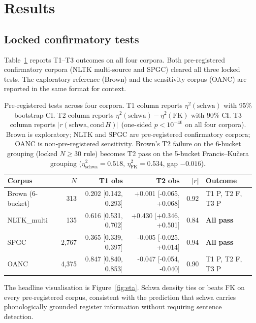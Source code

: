 \documentclass[11pt,a4paper]{article}
\begin{document}
\section{Results}

\subsection{Locked confirmatory tests}

Table~\ref{tab:tests} reports T1--T3 outcomes on all four corpora.
Both pre-registered confirmatory corpora (NLTK multi-source and SPGC)
cleared all three locked tests. The exploratory reference (Brown) and
the sensitivity corpus (OANC) are reported in the same format for
context.

\begin{table}[ht]
\centering
\small
\begin{tabular}{lrrrrl}
\toprule
Corpus & \(N\) & T1 obs & T2 obs & \(\lvert r \rvert\) & Outcome \\
\midrule
Brown (6-bucket) & 313 & 0.202 [0.142, 0.293] & {+}0.001 [{-}0.065, {+}0.068] & 0.92 & T1 P, T2 F, T3 P \\
NLTK\_multi      & 135 & 0.616 [0.531, 0.702] & {+}0.430 [{+}0.346, {+}0.501] & 0.84 & \textbf{All pass} \\
SPGC             & 2{,}767 & 0.365 [0.339, 0.397] & {-}0.005 [{-}0.025, {+}0.014] & 0.94 & \textbf{All pass} \\
OANC             & 4{,}375 & 0.847 [0.840, 0.853] & {-}0.047 [{-}0.054, {-}0.040] & 0.90 & T1 P, T2 F, T3 P \\
\bottomrule
\end{tabular}
\caption{Pre-registered tests across four corpora. T1 column reports
\(\eta^2(\text{schwa})\) with 95\% bootstrap CI. T2 column reports
\(\eta^2(\text{schwa}) - \eta^2(\text{FK})\) with 90\% CI. T3 column
reports \(\lvert r(\text{schwa}, \text{cond}\,H) \rvert\) (one-sided
\(p < 10^{-40}\) on all four corpora). Brown is exploratory; NLTK and
SPGC are pre-registered confirmatory corpora; OANC is non-pre-registered
sensitivity. Brown's T2 failure on the 6-bucket grouping (locked
\(N \ge 30\) rule) becomes T2 pass on the 5-bucket Francis--Ku\v{c}era
grouping (\(\eta^2_{\text{schwa}}=0.518\),
\(\eta^2_{\text{FK}}=0.534\), gap \(-0.016\)).}
\label{tab:tests}
\end{table}

The headline visualisation is Figure~\ref{fig:eta}. Schwa density ties
or beats FK on every pre-registered corpus, consistent with the
prediction that schwa carries phonologically grounded register
information without requiring sentence detection.
\end{document}
